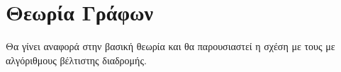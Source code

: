 \section{Θεωρία Γράφων}
Θα γίνει αναφορά στην βασική θεωρία και θα παρουσιαστεί η σχέση με τους με αλγόριθμους βέλτιστης διαδρομής.